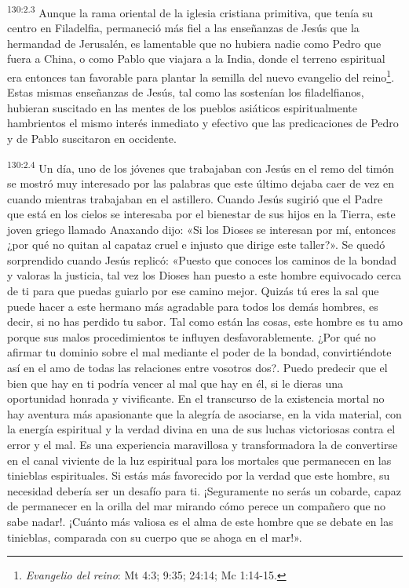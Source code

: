 \par 
\textsuperscript{130:2.3} Aunque la rama oriental de la iglesia cristiana primitiva, que tenía su centro en Filadelfia, permaneció más fiel a las enseñanzas de Jesús que la hermandad de Jerusalén, es lamentable que no hubiera nadie como Pedro que fuera a China, o como Pablo que viajara a la India, donde el terreno espiritual era entonces tan favorable para plantar la semilla del nuevo evangelio del reino\footnote{\textit{Evangelio del reino}: Mt 4:3; 9:35; 24:14; Mc 1:14-15.}. Estas mismas enseñanzas de Jesús, tal como las sostenían los filadelfianos, hubieran suscitado en las mentes de los pueblos asiáticos espiritualmente hambrientos el mismo interés inmediato y efectivo que las predicaciones de Pedro y de Pablo suscitaron en occidente.

\par 
\textsuperscript{130:2.4} Un día, uno de los jóvenes que trabajaban con Jesús en el remo del timón se mostró muy interesado por las palabras que este último dejaba caer de vez en cuando mientras trabajaban en el astillero. Cuando Jesús sugirió que el Padre que está en los cielos se interesaba por el bienestar de sus hijos en la Tierra, este joven griego llamado Anaxando dijo: «Si los Dioses se interesan por mí, entonces ¿por qué no quitan al capataz cruel e injusto que dirige este taller?». Se quedó sorprendido cuando Jesús replicó: «Puesto que conoces los caminos de la bondad y valoras la justicia, tal vez los Dioses han puesto a este hombre equivocado cerca de ti para que puedas guiarlo por ese camino mejor. Quizás tú eres la sal que puede hacer a este hermano más agradable para todos los demás hombres, es decir, si no has perdido tu sabor. Tal como están las cosas, este hombre es tu amo porque sus malos procedimientos te influyen desfavorablemente. ¿Por qué no afirmar tu dominio sobre el mal mediante el poder de la bondad, convirtiéndote así en el amo de todas las relaciones entre vosotros dos?. Puedo predecir que el bien que hay en ti podría vencer al mal que hay en él, si le dieras una oportunidad honrada y vivificante. En el transcurso de la existencia mortal no hay aventura más apasionante que la alegría de asociarse, en la vida material, con la energía espiritual y la verdad divina en una de sus luchas victoriosas contra el error y el mal. Es una experiencia maravillosa y transformadora la de convertirse en el canal viviente de la luz espiritual para los mortales que permanecen en las tinieblas espirituales. Si estás más favorecido por la verdad que este hombre, su necesidad debería ser un desafío para ti. ¡Seguramente no serás un cobarde, capaz de permanecer en la orilla del mar mirando cómo perece un compañero que no sabe nadar!. ¡Cuánto más valiosa es el alma de este hombre que se debate en las tinieblas, comparada con su cuerpo que se ahoga en el mar!».

